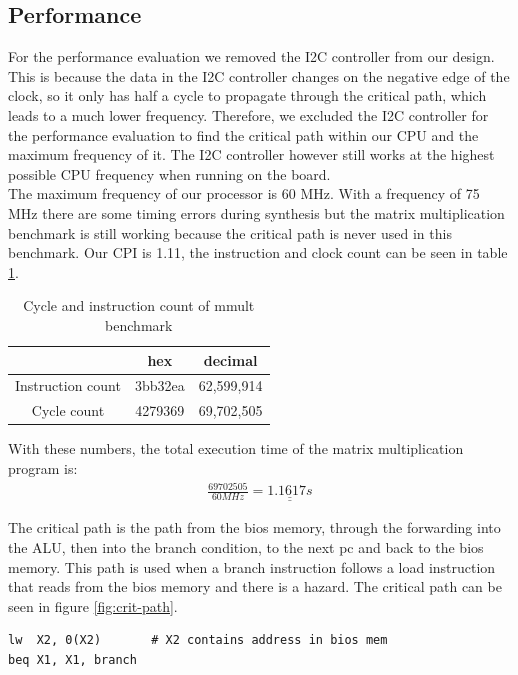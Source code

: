 \documentclass[12pt]{article}
\begin{document}
\subsection{Performance}
For the performance evaluation we removed the I2C controller from our design. This is because the data in the I2C controller changes on the negative edge of the clock, so it only has half a cycle to propagate through the critical path, which leads to a much lower frequency. Therefore, we excluded the I2C controller for the performance evaluation to find the critical path within our CPU and the maximum frequency of it. The I2C controller however still works at the highest possible CPU frequency when running on the board.\\
The maximum frequency of our processor is 60 MHz. With a frequency of 75 MHz there are some timing errors during synthesis but the matrix multiplication benchmark is still working because the critical path is never used in this benchmark. Our CPI is 1.11, the instruction and clock count can be seen in table \ref{tab:performance}.

\begin{table}[!hbtp]
\centering
\begin{tabular}{|c|c|c|}
\hline
& hex & decimal \\
\hline
Instruction count & 3bb32ea & 62,599,914\\
Cycle count & 4279369 & 69,702,505\\
\hline
\end{tabular}
\caption{Cycle and instruction count of mmult benchmark}
\label{tab:performance}
\end{table}

With these numbers, the total execution time of the matrix multiplication program is:
\begin{gather*}
\frac{69702505}{60 MHz} = \underline{\underline{1.1617s}}
\end{gather*}


The critical path is the path from the bios memory, through the forwarding into the ALU, then into the branch condition, to the next pc and back to the bios memory. This path is used when a branch instruction follows a load instruction that reads from the bios memory and there is a hazard. The critical path can be seen in figure \ref{fig:crit-path}.

\begin{lstlisting}
lw  X2, 0(X2)       # X2 contains address in bios mem
beq X1, X1, branch 
\end{lstlisting}
\end{document}

